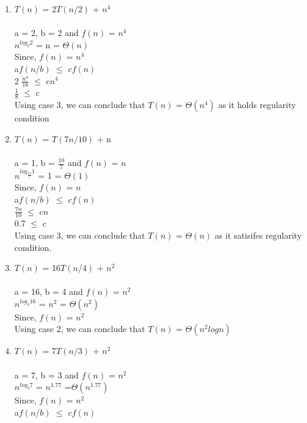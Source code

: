 \documentclass{article}
\begin{document}
\begin{enumerate}
    \begin{enumerate}
        \item $T(n)$ = 2$T(n/2)$ + $n^4$\\\\
        a = 2, b = 2 and $f(n)$ = $n^4$\\
        $n^{log_2^{}2}$ = n = $\Theta(n)$\\
        Since, $f(n)$ = $n^4$\\
        a$f(n/b)$ $\leq$ $cf(n)$\\
        2 $\frac{n^4}{16}$ $\leq$ c$n^4$\\
        $\frac{1}{8}$ $\leq$ c\\
        Using case 3, we can conclude that $T(n)$ = $\Theta(n^4)$  as it holds regularity condition\\
        \item $T(n)$ = $T(7n/10)$ + n \\\\
        a = 1, b = $\frac{10}{7}$ and $f(n)$ = $n$\\
        $n^{log_\frac{10}{7}^{}1}$ = 1 = $\Theta(1)$ \\
        Since, $f(n)$ = $n$\\
        a$f(n/b)$ $\leq$ $cf(n)$\\
        $\frac{7n}{10}$ $\leq$ c$n$\\
        0.7 $\leq$ c\\
         Using case 3, we can conclude that $T(n)$ = $\Theta(n)$ as it satisifes regularity condition.\\
        \item $T(n)$ = 16$T(n/4)$ + $n^2$ \\\\
        a = 16, b = 4 and $f(n)$ = $n^2$\\
        $n^{log_4^{}16}$ = $n^2$ = $\Theta(n^2)$ \\
        Since, $f(n)$ = $n^2$\\
        Using case 2, we can conclude that $T(n)$ = $\Theta(n^2logn)$\\
        \item $T(n)$ = 7$T(n/3)$ + $n^2$\\\\
        a = 7, b = 3 and $f(n)$ = $n^2$\\
        $n^{log_3^{}7}$ = $n^{1.77}$ =$\Theta(n^{1.77})$\\
        Since, $f(n)$ = $n^2$\\
        a$f(n/b)$ $\leq$ $cf(n)$\\

\end{enumerate}
\end{enumerate}
\end{document}
